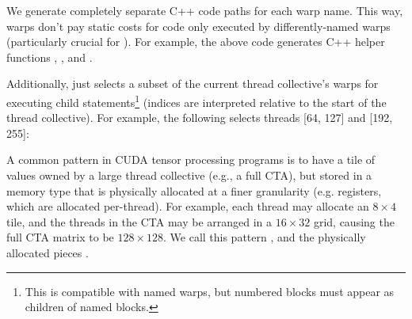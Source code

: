 

\filbreak
We generate completely separate C++ code paths for each warp name.
This way, warps don't pay static costs for code only executed by differently-named warps (particularly crucial for ).
For example, the above code generates C++ helper functions , , and .

\filbreak
Additionally,  just selects a subset \lighttt{[lo, hi)} of the current thread collective's warps for executing child statements\footnote{This is compatible with named warps, but numbered  blocks must appear as children of named  blocks.} (indices are interpreted relative to the start of the thread collective).
For example, the following selects threads [64, 127] and [192, 255]:




\filbreak
{}

A common pattern in CUDA tensor processing programs is to have a tile of values owned by a large thread collective (e.g., a full CTA), but stored in a memory type that is physically allocated at a finer granularity (e.g. registers, which are allocated per-thread).
For example, each thread may allocate an $8 \times 4$ tile, and the threads in the CTA may be arranged in a $16 \times 32$ grid, causing the full CTA matrix to be $128 \times 128$.
We call this pattern , and the physically allocated pieces .

